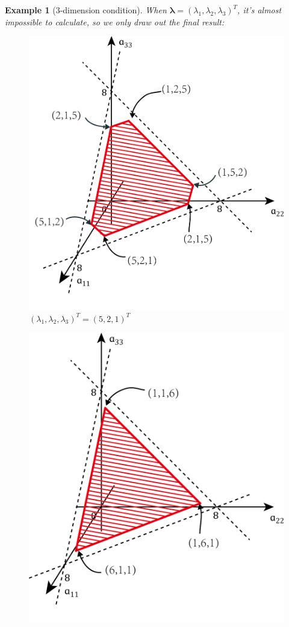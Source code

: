 \documentclass[11pt]{amsart}
\numberwithin{equation}{section}
\theoremstyle{plain}
\newtheorem{eg}[theorem]{Example}
\theoremstyle{plain}
\numberwithin{equation}{section}
\theoremstyle{remark}
\begin{document}
\begin{eg}[3-dimension condition] When $\bm{\lambda} =(\lambda_1,\lambda_2,\lambda_3)^T$, it's almost impossible to calculate, so we only draw out the final result:
	  	\begin{figure}[H]
	 	\begin{minipage}[t]{.49\textwidth}
	 		\centering
	 		\includegraphics[width=.95\textwidth]{figures/figure4.png}\\
	 		$(\lambda_1,\lambda_2,\lambda_3)^T=(5,2,1)^T$
	 	\end{minipage}
	 	\begin{minipage}[t]{.49\textwidth}
	 		\centering
	 		\includegraphics[width=.95\textwidth]{figures/figure3.png}\\

\end{minipage}
\end{figure}
\end{eg}
\end{document}
